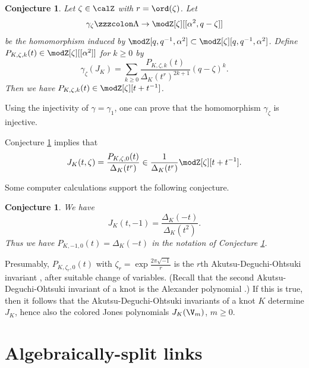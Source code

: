 \documentclass{amsart}
\numberwithin{equation}{section}
\numberwithin{figure}{section}
\theoremstyle{plain}
\newtheorem{conjecture}[theorem]{Conjecture}
\theoremstyle{definition}
\theoremstyle{remark}
\begin{document}
\begin{conjecture}
  \label{r58}
  Let $\zeta \in \calZ$ with $r=\ord(\zeta )$.  Let
  \begin{equation*}
    \gamma _\zeta \zzzcolon \Lambda \rightarrow \modZ [\zeta ][[\alpha ^2,q-\zeta ]]
  \end{equation*}
  be the homomorphism induced by
  $\modZ [q,q^{-1},\alpha ^2]\subset \modZ [\zeta ][q,q^{-1},\alpha ^2]$.    Define
  $P_{K,\zeta ,k}(t)\in \modZ [\zeta ][[\alpha ^2]]$ for $k\ge 0$ by
  \begin{equation*}
    \gamma _\zeta (J_K)=\sum_{k\ge 0}\frac{P_{K,\zeta ,k}(t)}{\Delta _K(t^r)^{2k+1}}(q-\zeta )^k.
  \end{equation*}
  Then we have $P_{K,\zeta ,k}(t)\in \modZ [\zeta ][t+t^{-1}]$.
\end{conjecture}

Using the injectivity of $\gamma =\gamma _1$, one can prove that the
homomorphism $\gamma _\zeta $ is injective.

Conjecture \ref{r58} implies that
\begin{equation*}
  J_K(t,\zeta )=\frac{P_{K,\zeta ,0}(t)}{\Delta _K(t^r)}
  \in \frac{1}{\Delta _K(t^r)}\modZ [\zeta ][t+t^{-1}].
\end{equation*}

Some computer calculations support the following conjecture.

\begin{conjecture}
  \label{r64}
  We have
  \begin{equation*}
    J_K(t,-1)=\frac{\Delta _K(-t)}{\Delta _K(t^2)}.
  \end{equation*}
  Thus we have $P_{K,-1,0}(t)=\Delta _K(-t)$ in the notation of Conjecture
  \ref{r58}.
\end{conjecture}

Presumably, $P_{K,\zeta _r,0}(t)$ with $\zeta _r=\exp\frac{2\pi \sqrt{-1}}{r}$
is the $r$th Akutsu-Deguchi-Ohtsuki invariant
\cite{Akutsu-Deguchi-Ohtsuki}, after suitable change of variables.
(Recall that the second Akutsu-Deguchi-Ohtsuki invariant of a knot is
the Alexander polynomial \cite{MurakamiJ}.)  If this is true, then it
follows that the Akutsu-Deguchi-Ohtsuki invariants of a knot $K$
determine $J_K$, hence also the colored Jones polynomials $J_K(\V_m)$,
$m\ge 0$.

\section{Algebraically-split links}
\label{sec8}
\end{document}
